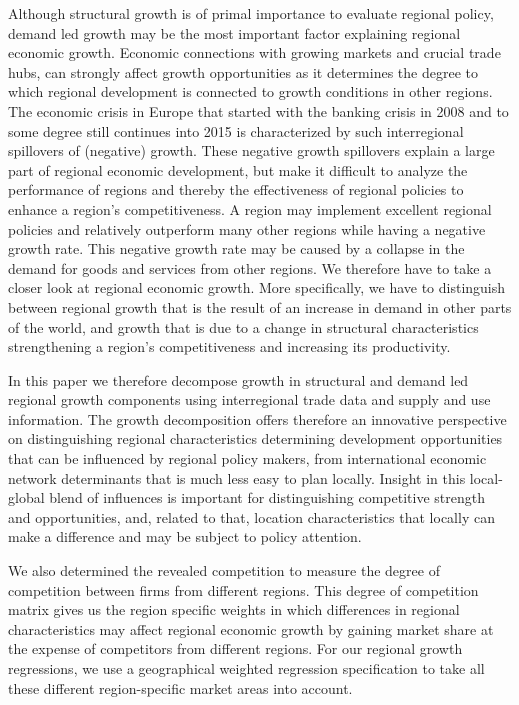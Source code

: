\documentclass[11pt,parskip,abstracton,notitlepage, paper=a4]{scrartcl}
\begin{document}
Although structural growth is of primal importance to evaluate regional policy, demand led growth may be the most important factor explaining regional economic growth. Economic connections with growing markets and crucial trade hubs, can strongly affect growth opportunities as it determines the degree to which regional development is connected to growth conditions in other regions. The economic crisis in Europe that started with the banking crisis in 2008 and to some degree still continues into 2015 is characterized by such interregional spillovers of (negative) growth. These negative growth spillovers explain a large part of regional economic development, but make it difficult to analyze the performance of regions and thereby the effectiveness of regional policies to enhance a region's competitiveness. A region may implement excellent regional policies and relatively outperform many other regions while having a negative growth rate. This negative growth rate may be caused by a collapse in the demand for goods and services from other regions. We therefore have to take a closer look at regional economic growth. More specifically, we have to distinguish between regional growth that is the result of an increase in demand in other parts of the world, and growth that is due to a change in structural characteristics strengthening a region's competitiveness and increasing its productivity. 

In this paper we therefore decompose growth in structural and demand led regional growth components using interregional trade data and supply and use information. The growth decomposition offers therefore an innovative perspective on distinguishing regional characteristics determining development opportunities that can be influenced by regional policy makers, from international economic network determinants that is much less easy to plan locally. Insight in this local-global blend of influences is important for distinguishing competitive strength and opportunities, and, related to that, location characteristics that locally can make a difference and may be subject to policy attention. 

We also determined the revealed competition \citep{thissen2013regional} to measure the degree of competition between firms from different regions. This degree of competition matrix gives us the region specific weights in which differences in regional characteristics may affect regional economic growth by gaining market share at the expense of competitors from different regions. For our regional growth regressions, we use a geographical weighted regression specification to take all these different region-specific market areas into account.
\end{document}
